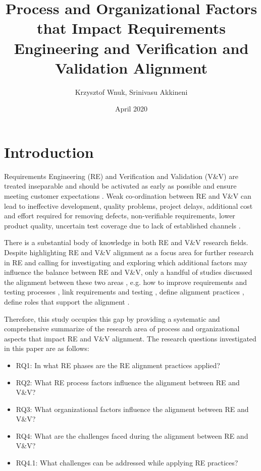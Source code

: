 \documentclass{article}
\title{Process and Organizational Factors that Impact Requirements Engineering and Verification and Validation Alignment}
\author{Krzysztof Wnuk, Srinivasu Akkineni}
\date{April 2020}
\begin{document}
\maketitle

\section{Introduction}
Requirements Engineering (RE) and Verification and Validation (V\&V) are treated inseparable and should be activated as early as possible and ensure meeting customer expectations \cite{wnuk2014delicate,bjarnason2014challenges}. Weak co-ordination between RE and V\&V can lead to ineffective development, quality problems, project delays,  additional cost and effort required for removing defects, non-verifiable requirements, lower product quality, uncertain test coverage due to lack of established channels \cite{bjarnason2014challenges,graham2002requirements,sabaliauskaite2010challenges,jones2009enabling}. 

There is a substantial body of knowledge in both RE and V\&V research fields. Despite highlighting RE and V\&V alignment as a focus area for further research in RE  \cite{sabaliauskaite2010challenges} \cite{bjarnason2014challenges} \cite{cheng2007research} and calling for investigating and exploring which additional factors may influence the balance between RE and V\&V, only a handful of studies discussed the alignment between these two areas \cite{barmi2011alignment}, e.g. how to improve requirements and testing processes \cite{kukkanen2009applying}, link requirements and testing \cite{barmi2011alignment,uusitalo2008linking,watkins1994and}, define alignment practices  \cite{bjarnason2014challenges},  define roles that support the alignment  \cite{bjarnason2014challenges} \cite{sabaliauskaite2010challenges}.

Therefore, this study occupies this gap by providing a systematic and comprehensive summarize of the research area of process and organizational aspects that impact RE and V\&V alignment. The research questions investigated in this paper are as follows: 

\begin{itemize}
    \item RQ1: In what RE phases are the RE alignment practices applied? 
    \item RQ2: What RE process factors influence the alignment between RE and V\&V?
    \item RQ3: What organizational factors influence the alignment between RE and V\&V?
    \item RQ4: What are the challenges faced during the alignment between RE and V\&V?
    \item RQ4.1: What challenges can be addressed while applying RE practices?
\end{itemize}
\end{document}
